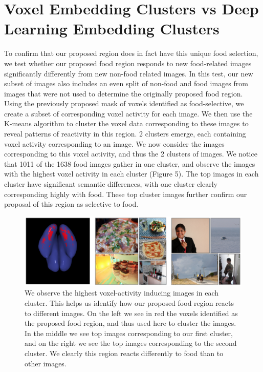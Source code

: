 \documentclass[../thesis.tex]{subfiles}
\begin{document}
\section{Voxel Embedding Clusters vs Deep Learning Embedding Clusters}    
To confirm that our proposed region does in fact have this unique food selection, we test whether our proposed food region responds to new food-related images significantly differently from new non-food related images. In this test, our new subset of images also includes an even split of non-food and food images from images that were not used to determine the originally proposed food region. Using the previously proposed mask of voxels identified as food-selective, we create a subset of corresponding voxel activity for each image. We then use the K-means algorithm to cluster the voxel data corresponding to these images to reveal patterns of reactivity in this region. 2 clusters emerge, each containing voxel activity corresponding to an image. We now consider the images corresponding to this voxel activity, and thus the 2 clusters of images. We notice that 1011 of the 1638 food images gather in one cluster, and observe the images with the highest voxel activity in each cluster (Figure 5). The top images in each cluster have significant semantic differences, with one cluster clearly corresponding highly with food. These top cluster images further confirm our proposal of this region as selective to food. 
    \begin{figure}
        \centering
        \includegraphics[scale=0.47]{fig5.png}
            \caption{We observe the highest voxel-activity inducing images in each cluster. This helps us identify how our proposed food region reacts to different images. On the left we see in red the voxels identified as the proposed food region, and thus used here to cluster the images. In the middle we see top images corresponding to our first cluster, and on the right we see the top images corresponding to the second cluster. We clearly this region reacts differently to food than to other images. } \label{fig1}
    \end{figure}
\end{document}

